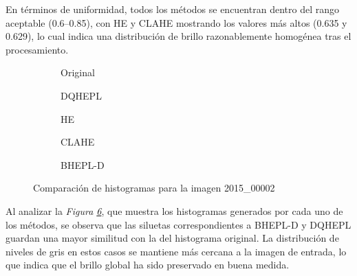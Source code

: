\documentclass[sigchi]{acmart}
\begin{document}
En términos de uniformidad, todos los métodos se encuentran dentro del rango aceptable
(0.6–0.85), con HE y CLAHE mostrando los valores más altos (0.635 y 0.629), lo cual indica una
distribución de brillo razonablemente homogénea tras el procesamiento.

\begin{figure}[htbp]
	\centering

	\begin{subfigure}[b]{0.45\textwidth}
		\resizebox{\linewidth}{!}{}
		\caption{Original}
		\label{fig:original_1}
	\end{subfigure}
	\hfill
	\begin{subfigure}[b]{0.45\textwidth}
		\resizebox{\linewidth}{!}{}
		\caption{DQHEPL}
		\label{fig:dqhepl_1}
	\end{subfigure}

	\begin{subfigure}[b]{0.45\textwidth}
		\resizebox{\linewidth}{!}{}
		\caption{HE}
		\label{fig:he_1}
	\end{subfigure}
	\hfill
	\begin{subfigure}[b]{0.45\textwidth}
		\resizebox{\linewidth}{!}{}
		\caption{CLAHE}
		\label{fig:clahe_1}
	\end{subfigure}

	\centering
	\begin{subfigure}[b]{0.45\textwidth}
		\resizebox{\linewidth}{!}{}
		\caption{BHEPL-D}
		\label{fig:bhepl_1}
	\end{subfigure}

	\caption{Comparación de histogramas para la imagen 2015\_00002}
	\label{fig:histogramas_1}
\end{figure}

Al analizar la \emph{Figura \ref{fig:histogramas_1}}, que muestra los histogramas generados por cada
uno de los métodos, se observa que las siluetas correspondientes a BHEPL-D y DQHEPL guardan una
mayor similitud con la del histograma original. La distribución de niveles de gris en estos
casos se mantiene más cercana a la imagen de entrada, lo que indica que el brillo global ha
sido preservado en buena medida.
\end{document}
